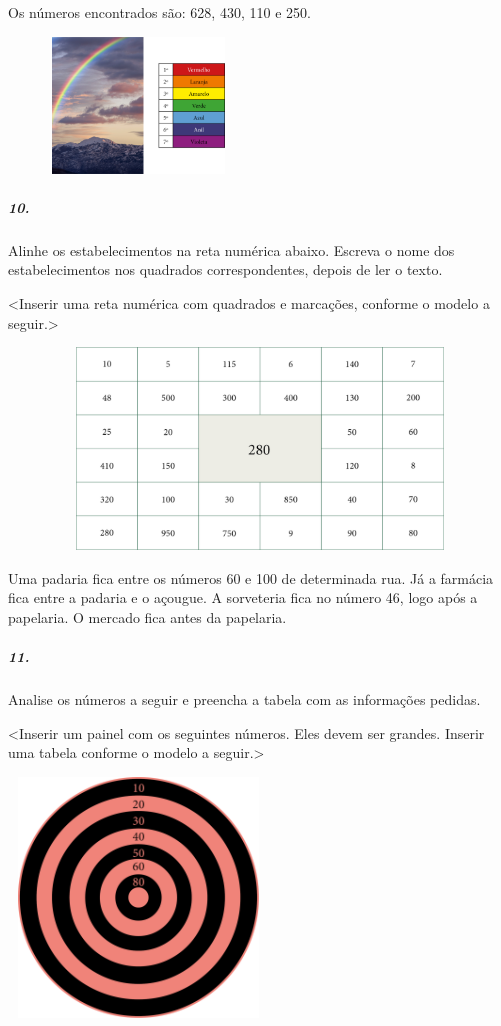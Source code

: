 Os números encontrados são: 628, 430, 110 e 250.

\includegraphics[width=2.71875in,height=1.42734in]{media/image21.png}

\subparagraph{10. }\label{section-9}

Alinhe os estabelecimentos na reta numérica abaixo. Escreva o nome dos
estabelecimentos nos quadrados correspondentes, depois de ler o texto.

\textless{}Inserir uma reta numérica com quadrados e marcações, conforme
o modelo a seguir.\textgreater{}

\includegraphics[width=6.36364in,height=2.11458in]{media/image22.png}

Uma padaria fica entre os números 60 e 100 de determinada rua. Já a
farmácia fica entre a padaria e o açougue. A sorveteria fica no número
46, logo após a papelaria. O mercado fica antes da papelaria.

\subparagraph{11. }\label{section-10}

Analise os números a seguir e preencha a tabela com as informações
pedidas.

\textless{}Inserir um painel com os seguintes números. Eles devem ser
grandes. Inserir uma tabela conforme o modelo a seguir.\textgreater{}

\includegraphics[width=2.72103in,height=2.51437in]{media/image23.png}

